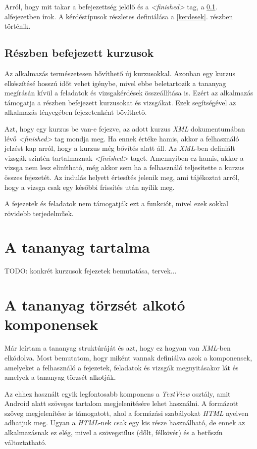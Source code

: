 \documentclass[12pt,a4paper]{article}
\newcommand{\xml}{\textit{XML}\xspace}
\begin{document}
	Arról, hogy mit takar a befejezettség jelölő és a \textit{<finished>} tag, a \ref{reszben_befejezett_kurzusok}. alfejezetben írok. A kérdéstípusok részletes definiálása a \ref{kerdesek}. részben történik.
	
	\subsection{Részben befejezett kurzusok}\label{reszben_befejezett_kurzusok}
	
	Az alkalmazás természetesen bővíthető új kurzusokkal. Azonban egy kurzus elkészítésé hosszú időt vehet igénybe, mivel ebbe beletartozik a tananyag megírásán kívül a feladatok és vizsgakérdések összeállítása is. Ezért az alkalmazás támogatja a részben befejezett kurzusokat és vizsgákat. Ezek segítségével az alkalmazás lényegében fejezetenként bővíthető.
	
	Azt, hogy egy kurzus be van-e fejezve, az adott kurzus \xml dokumentumában lévő \textit{<finished>} tag mondja meg. Ha ennek értéke hamis, akkor a felhasználó jelzést kap arról, hogy a kurzus még bővítés alatt áll. Az \xml-ben definiált vizsgák szintén tartalmaznak  \textit{<finished>} taget. Amennyiben ez hamis, akkor a vizsga nem lesz elinítható, még akkor sem ha a felhasználó teljesítette a kurzus összes fejezetét. Az indulás helyett értesítés jelenik meg, ami tájékoztat arról, hogy a vizsga csak egy későbbi frissítés után nyílik meg.
	
	A fejezetek és feladatok nem támogatják ezt a funkciót, mivel ezek sokkal rövidebb terjedelműek.
	
	\section{A tananyag tartalma}
	
	TODO: konkrét kurzusok fejezetek bemutatása, tervek...
	
	\section{A tananyag törzsét alkotó komponensek}\label{tananyag_torzse}

	Már leírtam a tananyag struktúráját és azt, hogy ez hogyan van \xml-ben elkódolva. Most bemutatom, hogy miként vannak definiálva azok a komponensek, amelyeket a felhasználó a fejezetek, feladatok és vizsgák megnyitásakor lát és amelyek a tananyag törzsét alkotják.
	
	Az ehhez használt egyik legfontosabb komponens a \textit{TextView} osztály, amit Android alatt szöveges tartalom megjelenítésére lehet használni. A formázott szöveg megjelenítése is támogatott, ahol a formázási szabályokat \textit{HTML} nyelven adhatjuk meg. Ugyan a \textit{HTML}-nek csak egy kis része használható, de ennek az alkalmazásnak ez elég, mivel a szövegstílus (dőlt, félkövér) és a betűszín változtatható.
	
\end{document}
